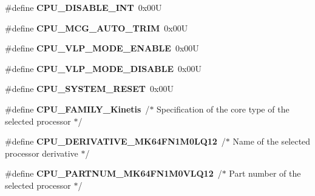 \begin{DoxyCompactItemize}
\item 
\#define {\bfseries C\+P\+U\+\_\+\+D\+I\+S\+A\+B\+L\+E\+\_\+\+I\+NT}~0x00U\hypertarget{group___c_p_u___config__module_ga1ff52c29167dbe65c260660b0f5b8db3}{}\label{group___c_p_u___config__module_ga1ff52c29167dbe65c260660b0f5b8db3}

\item 
\#define {\bfseries C\+P\+U\+\_\+\+M\+C\+G\+\_\+\+A\+U\+T\+O\+\_\+\+T\+R\+IM}~0x00U\hypertarget{group___c_p_u___config__module_gabb697c970c320ed1d28dcce488d8bc11}{}\label{group___c_p_u___config__module_gabb697c970c320ed1d28dcce488d8bc11}

\item 
\#define {\bfseries C\+P\+U\+\_\+\+V\+L\+P\+\_\+\+M\+O\+D\+E\+\_\+\+E\+N\+A\+B\+LE}~0x00U\hypertarget{group___c_p_u___config__module_ga69d3cc4c0f84e5ade4ab76439744c8c6}{}\label{group___c_p_u___config__module_ga69d3cc4c0f84e5ade4ab76439744c8c6}

\item 
\#define {\bfseries C\+P\+U\+\_\+\+V\+L\+P\+\_\+\+M\+O\+D\+E\+\_\+\+D\+I\+S\+A\+B\+LE}~0x00U\hypertarget{group___c_p_u___config__module_gacab232855573ffda96b3d8c7306e8b8c}{}\label{group___c_p_u___config__module_gacab232855573ffda96b3d8c7306e8b8c}

\item 
\#define {\bfseries C\+P\+U\+\_\+\+S\+Y\+S\+T\+E\+M\+\_\+\+R\+E\+S\+ET}~0x00U\hypertarget{group___c_p_u___config__module_gabe83076dd8a87a50123b381e628372b0}{}\label{group___c_p_u___config__module_gabe83076dd8a87a50123b381e628372b0}

\item 
\#define {\bfseries C\+P\+U\+\_\+\+F\+A\+M\+I\+L\+Y\+\_\+\+Kinetis}~/$\ast$ Specification of the core type of the selected processor $\ast$/\hypertarget{group___c_p_u___config__module_ga5bf3022570d9bb7a0d666f2dd9db6a34}{}\label{group___c_p_u___config__module_ga5bf3022570d9bb7a0d666f2dd9db6a34}

\item 
\#define {\bfseries C\+P\+U\+\_\+\+D\+E\+R\+I\+V\+A\+T\+I\+V\+E\+\_\+\+M\+K64\+F\+N1\+M0\+L\+Q12}~/$\ast$ Name of the selected processor derivative $\ast$/\hypertarget{group___c_p_u___config__module_ga2792070e0eb872f825d274bbd20c7548}{}\label{group___c_p_u___config__module_ga2792070e0eb872f825d274bbd20c7548}

\item 
\#define {\bfseries C\+P\+U\+\_\+\+P\+A\+R\+T\+N\+U\+M\+\_\+\+M\+K64\+F\+N1\+M0\+V\+L\+Q12}~/$\ast$ Part number of the selected processor $\ast$/\hypertarget{group___c_p_u___config__module_ga8f55bdaa1e9aa37b9fcc4a3c13728611}{}\label{group___c_p_u___config__module_ga8f55bdaa1e9aa37b9fcc4a3c13728611}


\end{DoxyCompactItemize}
